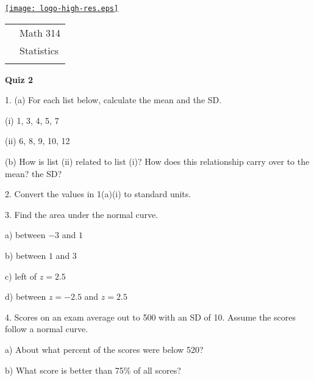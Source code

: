 \documentclass[10pt]{article}
\begin{document}
\pagestyle{empty}
\lstset{language=R, showspaces=false, showstringspaces=false}

\href{http://www.shepherd.edu}{\texttt{[image: logo-high-res.eps]}}
\vspace{-1.69cm}

{\small
\begin{tabular}{cl}
& Math 314\\
& Statistics\\
\hspace{5.28in} & %
\end{tabular}
}
\setlength{\baselineskip}{1.05\baselineskip}
\bigskip

\begin{center}
\textbf{\large  Quiz 2}
\end{center}
\medskip


1. (a) For each list below, calculate the mean and the SD.

\hspace{10pt} (i) 1, 3, 4, 5, 7\vspace{2.5in}

\hspace{10pt} (ii) 6, 8, 9, 10, 12\vspace{1.5in}

\hphantom{1. } (b) How is list (ii) related to list (i)?  How does this
relationship carry over to the mean?  the SD?
\vspace{1.2in}

2. Convert the values in 1(a)(i) to standard units.
\vfill
\eject
{\ }

3. Find the area under the normal curve.

\hspace{10pt} a) between $-3$ and $1$
\vspace{1.2in}

\hspace{10pt} b) between $1$ and $3$
\vspace{1.2in}

\hspace{10pt} c) left of $z=2.5$
\vspace{1.2in}

\hspace{10pt} d) between $z=-2.5$ and  $z=2.5$
\vspace{1.2in}

4. Scores on an exam average out to 500 with an SD of 10.  Assume the  scores follow a
normal curve.

\hspace{10pt} a) About what percent of the scores were below 520?
\vspace{1.2in}

\hspace{10pt} b) What score is better than 75\% of all scores?
\vfill
\eject
\end{document}
